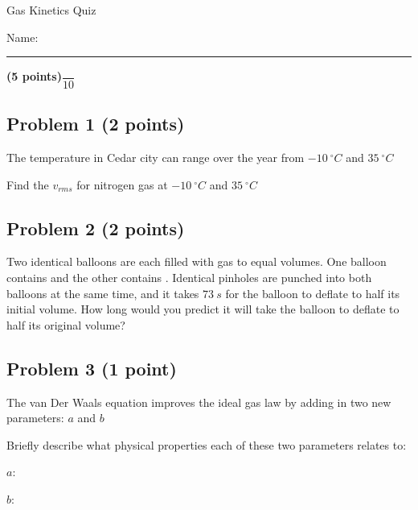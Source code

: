 \documentclass[12pt, letterpaper]{memoir}
\begin{document}
	\begin{center}
		{\large Gas Kinetics Quiz}
	\end{center}
	{\large Name: \rule[-1mm]{4in}{.1pt} {\bfseries (5 points)}\hspace{4em}$\dfrac{~}{10}$} 
	
	\subsection*{Problem 1 (2 points)}
	The temperature in Cedar city can range over the year from $-10~^\circ C$ and $35~^\circ C$
	
	\noindent Find the $v_{rms}$ for nitrogen gas at $-10~^\circ C$ and $35~^\circ C$
	
	\vspace{10em}
	\subsection*{Problem 2 (2 points)}
	Two identical balloons are each filled with gas to equal volumes. One balloon contains  and the other contains . Identical pinholes are punched into both balloons at the same time, and it takes $73~s$ for the  balloon to deflate to half its initial volume. How long would you predict it will take the  balloon to deflate to half its original volume?
	
	\vspace{10em}
	\subsection*{Problem 3 (1 point)}
	The van Der Waals equation improves the ideal gas law by adding in two new parameters: $a$ and $b$
	
	\noindent Briefly describe what physical properties each of these two parameters relates to:
	
	\vspace{1em}
	$a$:
	
	\vspace{3em}
	$b$:
\end{document}
